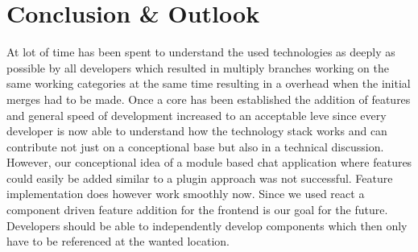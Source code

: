 \section{Conclusion \& Outlook}
At lot of time has been spent to understand the used technologies as deeply as possible by all developers which resulted in multiply branches working on the same working categories at the same time resulting in a overhead when the initial merges had to be made. Once a core has been established the addition of features and general speed of development increased to an acceptable leve since every developer is now able to understand how the technology stack works and can contribute not just on a conceptional base but also in a technical discussion.
However, our conceptional idea of a module based chat application where features could easily be added similar to a plugin approach was not successful. Feature implementation does however work smoothly now. Since we used react a component driven feature addition for the frontend is our goal for the future. Developers should be able to independently develop components which then only have to be referenced at the wanted location.
